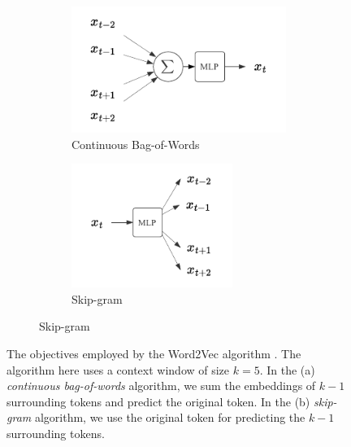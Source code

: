 {\begin{figure}[ht]
    \centering

    \begin{subfigure}{\textwidth}
        \centering
        \begin{subfigure}{0.45\textwidth}
            \centering
            \includegraphics[width=\textwidth]{img/skipgram.pdf}
            \caption{Continuous Bag-of-Words}
            \label{fig:cbow}
        \end{subfigure}
        \hspace{-20px}
        \begin{subfigure}{0.45\textwidth}
            \centering
            \includegraphics[width=0.75\textwidth]{img/cbow.pdf}
            \caption{Skip-gram}
            \label{fig:skipgram}
        \end{subfigure}
    \end{subfigure}
    \caption[Word2Vec objectives.]{The objectives employed by the Word2Vec algorithm \cite{mikolov2013distributed}. The algorithm here uses a context window of size $k=5$. In the (a) \emph{continuous bag-of-words} algorithm, we sum the embeddings of $k-1$ surrounding tokens and predict the original token. In the (b) \emph{skip-gram} algorithm, we use the original token for predicting the $k-1$ surrounding tokens.}
    \label{fig:word2vec}
\end{figure}

}
